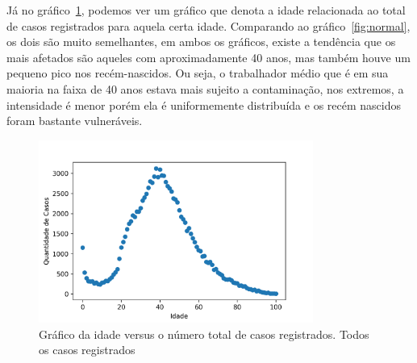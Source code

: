 Já no gráfico~\ref{fig:uc9}, podemos ver um gráfico que denota a idade relacionada ao total de casos registrados para aquela certa idade. Comparando ao gráfico~\ref{fig:normal}, os dois são muito semelhantes, em ambos os gráficos, existe a tendência que os mais afetados são aqueles com aproximadamente 40 anos, mas também houve um pequeno pico nos recém-nascidos. Ou seja, o trabalhador médio que é em sua maioria na faixa de 40 anos estava mais sujeito a contaminação, nos extremos, a intensidade é menor porém ela é uniformemente distribuída e os recém nascidos foram bastante vulneráveis. 
\begin{figure}[!ht]
\centering
    \includegraphics[width=9cm]{img/distribuicaoPorIdade2.7.png}
    \caption{Gráfico da idade versus o número total de casos registrados. Todos os casos registrados}
    \label{fig:uc9} %
\end{figure}